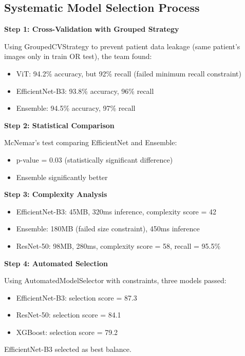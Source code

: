 \subsection{Systematic Model Selection Process}

\textbf{Step 1: Cross-Validation with Grouped Strategy}

Using GroupedCVStrategy to prevent patient data leakage (same patient's images only in train OR test), the team found:

\begin{itemize}
    \item ViT: 94.2\% accuracy, but 92\% recall (failed minimum recall constraint)
    \item EfficientNet-B3: 93.8\% accuracy, 96\% recall
    \item Ensemble: 94.5\% accuracy, 97\% recall
\end{itemize}

\textbf{Step 2: Statistical Comparison}

McNemar's test comparing EfficientNet and Ensemble:
\begin{itemize}
    \item p-value = 0.03 (statistically significant difference)
    \item Ensemble significantly better
\end{itemize}

\textbf{Step 3: Complexity Analysis}

\begin{itemize}
    \item EfficientNet-B3: 45MB, 320ms inference, complexity score = 42
    \item Ensemble: 180MB (failed size constraint), 450ms inference
    \item ResNet-50: 98MB, 280ms, complexity score = 58, recall = 95.5\%
\end{itemize}

\textbf{Step 4: Automated Selection}

Using AutomatedModelSelector with constraints, three models passed:
\begin{itemize}
    \item EfficientNet-B3: selection score = 87.3
    \item ResNet-50: selection score = 84.1
    \item XGBoost: selection score = 79.2
\end{itemize}

EfficientNet-B3 selected as best balance.

